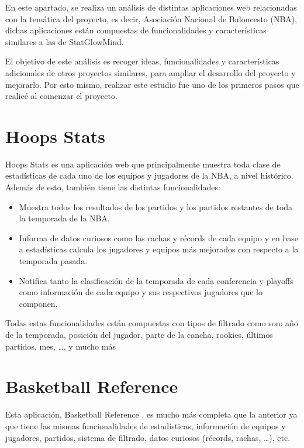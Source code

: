 
En este apartado, se realiza un análisis de distintas aplicaciones web relacionadas con la temática del proyecto, es decir, Asociación Nacional de Baloncesto (NBA), dichas aplicaciones están compuestas de funcionalidades y características similares a las de StatGlowMind.  

El objetivo de este análisis es recoger ideas, funcionalidades y características adicionales de otros proyectos similares, para ampliar el desarrollo del proyecto y mejorarlo. Por esto mismo, realizar este estudio fue uno de los primeros pasos que realicé al comenzar el proyecto. 

\hfill

\section{Hoops Stats}
Hoops Stats \cite{hoopsstats} es una aplicación web que principalmente muestra toda clase de estadísticas de cada uno de los equipos y jugadores de la NBA, a nivel histórico. Además de esto, también tiene las distintas funcionalidades: 
\begin{itemize}
\tightlist
    \item Muestra todos los resultados de los partidos y los partidos restantes de toda la temporada de la NBA.
    \item Informa de datos curiosos como las rachas y récords de cada equipo y en base a estadísticas calcula los jugadores y equipos más mejorados con respecto a la temporada pasada.
    \item Notifica tanto la clasificación de la temporada de cada conferencia y playoffs como información de cada equipo y sus respectivos jugadores que lo componen.
\end{itemize}
\hfill
Todas estas funcionalidades están compuestas con tipos de filtrado como son: año de la temporada, posición del jugador, parte de la cancha, rookies, últimos partidos, mes, \ldots , y mucho más


\hfill

\section{Basketball Reference}
Esta aplicación, Basketball Reference \cite{basketballreference}, es mucho más completa que la anterior ya que tiene las mismas funcionalidades de estadísticas, información de equipos y jugadores, partidos, sistema de filtrado, datos curiosos (récords, rachas, \ldots), etc.  

